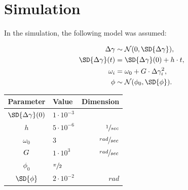 \documentclass{article}
\newcommand{\Norm}{\mathcal{N}}
\begin{document}
\section{Simulation}
\newcommand{\ytcoef}{h}
\newcommand{\dwcoef}{g}
\newcommand{\vp}[2]{{#1}\cdot 10^{#2} }
In the simulation, the following model was assumed:\\
\begin{minipage}{.5\textwidth}
	\begin{align*}
		\dy &\sim \Norm(0, \SD{\dy}), \\
		\SD{\dy}(t) &= \SD{\dy}(0) + \ytcoef\cdot t, \\
		\omega_i &= \omega_0 + \wycoef\cdot \dy_i^2, \\
		\phi &\sim \Norm(\phi_0, \SD{\phi}).
	\end{align*}
\end{minipage}
\begin{minipage}{.5\textwidth}
	\begin{tabular}{clr}
		  Parameter   & Value            &          Dimension \\ \hline
		$\SD{\dy}(0)$ & $\vp{1}{-3}$     &  \\
		  $\ytcoef$    & $\vp{5}{-6}$     &   $\sfrac{1}{sec}$ \\
		 $\omega_0$   & $3$              & $\sfrac{rad}{sec}$ \\
		  $G$    & $\vp{1}{3}$      & $\sfrac{rad}{sec}$ \\
		  $\phi_0$    & $\sfrac{\pi}{2}$ &  \\
		 $\SD{\phi}$  & $\vp{2}{-2}$     &              $rad$ \\ \hline
	\end{tabular}
\end{minipage}
\end{document}
